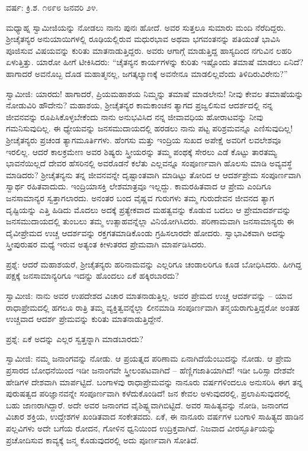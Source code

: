 \begin{center}
ವರ್ಷ: ಕ್ರಿ.ಶ. ೧೮೯೮ ಜನವರಿ ೨೪.
\end{center}

ಮಧ್ಯಾಹ್ನ ಸ್ವಾಮೀಜಿಯನ್ನು ನೋಡಲು ನಾನು ಪುನಃ ಹೋದೆ. ಅವರ ಸುತ್ತಲೂ ಸುಮಾರು ಮಂದಿ ನೆರೆದಿದ್ದರು. ಶ‍್ರೀಚೈತನ್ಯರ ಅನುಯಾಯಿಗಳಲ್ಲಿ ರೂಢಿಯಲ್ಲಿರುವ ಮಧುರಭಾವ ಅಥವಾ ಭಗವಂತನನ್ನು ಪತಿಯಂತೆ ಭಾವಿಸಿ ಪೂಜಿಸುವ ವಿಷಯವನ್ನು ಕುರಿತು ಮಾತನಾಡುತ್ತಿದ್ದರು. ಅವರು ಆಗಾಗ್ಗೆ ಮಾಡುತ್ತಿದ್ದ ಹಾಸ್ಯದಿಂದ ನಗುವಿನ ಲಹರಿ ಏಳುತ್ತಿತ್ತು. ಯಾರೋ ಹೀಗೆ ಟೀಕಿಸಿದರು: “ಚೈತನ್ಯನ ಕಾರ್ಯಗಳನ್ನು ಕುರಿತು ಇಷ್ಟೊಂದು ತಮಾಷೆ ಮಾಡಲು ಏನಿದೆ? ಹಾಗಾದರೆ ಅವನೊಬ್ಬ ದೊಡ ಮಹಾತ್ಮನಲ್ಲ, ಜಗತ್ಕಲ್ಯಾಣಕ್ಕೆ ಅವನೇನೂ ಮಾಡಲಿಲ್ಲವೆಂದು ತಿಳಿದಿರುವಿರೇನು?”

ಸ್ವಾಮೀಜಿ: ಯಾರದು! ಹಾಗಾದರೆ, ಪ್ರಿಯಮಹಾಶಯ ನಿಮ್ಮನ್ನು ತಮಾಷೆ ಮಾಡಲೇನು! ನೀವು ಕೇವಲ ತಮಾಷೆಯನ್ನು ನೋಡುವಿರಿ ಹೌದೇನು? ಮಹಾಶಯ, ಶ‍್ರೀಚೈತನ್ಯರ ಕಾಮಕಾಂಚನ ತ್ಯಾಗದ ಪ್ರಜ್ವಲಿಸುವ ಆದರ್ಶದಲ್ಲಿ ನನ್ನ ಜೀವನವನ್ನು ರೂಪಿಸಿಕೊಳ್ಳಬೇಕೆಂದು ನಾನು ಅನುಭವಿಸಿದ ನನ್ನ ಜೀವಾವಧಿಯ ಹೋರಾಟವನ್ನು ನೀವು ಗಮನಿಸುವುದಿಲ್ಲ. ಈ ಧ್ಯೇಯವನ್ನು ಜನಸಮುದಾಯದಲ್ಲಿ ಹರಡಲು ನಾನು ಪಟ್ಟ ಪರಿಶ್ರಮವನ್ನೂ ಎಣಿಸುವುದಿಲ್ಲ! ಶ‍್ರೀಚೈತನ್ಯರು ಪ್ರಚಂಡ ತ್ಯಾಗಮೂರ್ತಿಗಳು. ಹೆಂಗಸು ಮತ್ತು ಇಂದ್ರಿಯ ಸುಖದ ಅಪೇಕ್ಷೆ ಅವರಿಗೆ ಲವಲೇಶವೂ ಇರಲಿಲ್ಲ. ಆದರೆ ಕಾಲಕ್ರಮೇಣ ಅವರ ಶಿಷ್ಯರು ಸ್ತ್ರೀಯರನ್ನು ತಮ್ಮ ಪಂಥಕ್ಕೆ ಸೇರಲು ಎಡೆ ಕೊಟ್ಟು ತಾರತಮ್ಯ ಭಾವನೆಯಿಲ್ಲದೆ ದೇವರ ಹೆಸರಿನಲ್ಲಿ ಅವರೊಡನೆ ಕಲೆತು ಎಲ್ಲವನ್ನೂ ಸಂಪೂರ್ಣವಾಗಿ ಹೊಲಸು ಮಾಡಿ ಅವ್ಯವಸ್ಥೆ ಮಾಡಿದರು? ಶ‍್ರೀಚೈತನ್ಯನು ತನ್ನ ಜೀವನವನ್ನೇ ದೃಷ್ಟಾಂತವಾಗಿ ಮಾಡಿಟ್ಟು ತೋರಿದ ಆ ಆದರ್ಶಪ್ರೇಮ ಸಂಪೂರ್ಣವಾಗಿ ಸ್ವಾರ್ಥ ರಹಿತವಾದುದು. ಇಂದ್ರಿಯಾಸಕ್ತಿ ಲೇಶಮಾತ್ರವೂ ಇಲ್ಲದ್ದು. ಕಾಮರಹಿತವಾದ ಆ ಪ್ರೇಮ ಎಂದಿಗೂ ಜನಸಾಮಾನ್ಯರ ಸ್ವತ್ತಾಗಲಾರದು. ಅನಂತರ ಬಂದ ವೈಷ್ಣವ ಗುರುಗಳು ತಮ್ಮ ಗುರುದೇವನ ಜೀವನದ ತ್ಯಾಗ ದೃಷ್ಟಿಯನ್ನು ಎತ್ತಿ ಹಿಡಿದು ಮೊದಲು ಅದಕ್ಕೆ ಪ್ರತ್ಯೇಕವಾದ ಮಹತ್ವವನ್ನು ಕೊಡುವ ಬದಲು ಆ ಪ್ರೇಮಾದರ್ಶವನ್ನು ಜನಸಮುದಾಯದಲ್ಲಿ ತುಂಬಲು ತಮ್ಮ ಉತ್ಸಾಹವನ್ನೆಲ್ಲಾ ವಿನಿಯೋಗಿಸಿದರು. ಪರಿಣಾಮವಾಗಿ ಜನಸಾಮಾನ್ಯರು ಈ ದೈವೀಪ್ರೇಮದ ಉಚ್ಚ ಆದರ್ಶವನ್ನು ರಕ್ತಗತಮಾಡಿಕೊಂಡು ಗ್ರಹಿಸಲಾರದೇ ಹೋದರು. ಸ್ವಾಭಾವಿಕವಾಗಿ ಅದನ್ನು ಸ್ತ್ರೀಪುರುಷರ ಮಧ್ಯೆ ಇರುವ ಅತ್ಯಂತ ಕೀಳುತರದ ಪ್ರೇಮವಾಗಿ ಮಾರ್ಪಡಿಸಿದರು.

ಪ್ರಶ್ನೆ: ಆದರೆ ಮಹಾಶಯರೆ, ಶ‍್ರೀಚೈತನ್ಯರು ಹರಿನಾಮವನ್ನು ಎಲ್ಲರಿಗೂ ಚಂಡಾಲರಿಗೂ ಕೂಡ ಬೋಧಿಸಿದರು. ಹೀಗಿದ್ದ ಪಕ್ಷಕ್ಕೆ ಜನಸಾಮಾನ್ಯರಿಗೂ ಇದನ್ನು ಹೊಂದಲು ಏಕೆ ಹಕ್ಕಿರಬಾರದು?

ಸ್ವಾಮೀಜಿ: ನಾನು ಅವರ ಉಪದೇಶದ ವಿಚಾರ ಮಾತನಾಡುತ್ತಿಲ್ಲ. ಅವರ ಪ್ರೇಮದ ಉಚ್ಚ ಆದರ್ಶವನ್ನು – ಯಾವ ರಾಧಾಪ್ರೇಮದಲ್ಲಿ ಹಗಲೂ ರಾತ್ರಿ ತಮ್ಮ ವ್ಯಕ್ತಿತ್ವವನ್ನೆಲ್ಲಾ ಲೀನಮಾಡಿ ಸಂಪೂರ್ಣವಾಗಿ ತನ್ಮಯರಾಗುತ್ತಿದ್ದರೋ ಅಂತಹ ಉಚ್ಚವಾದ ಆದರ್ಶ ಪ್ರೇಮವನ್ನು ಕುರಿತು ಮಾತನಾಡುತ್ತಿದ್ದೇನೆ.

ಪ್ರಶ್ನೆ: ಏಕೆ ಅದನ್ನು ಎಲ್ಲರ ಸ್ವತ್ತನ್ನಾಗಿ ಮಾಡಬಾರದು?

ಸ್ವಾಮೀಜಿ: ನಮ್ಮ ಜನಾಂಗವನ್ನು ನೋಡು. ಆ ಪ್ರಯತ್ನದ ಪರಿಣಾಮ ಏನಾಗಿದೆಯೆಂಬುದನ್ನು ನೋಡು. ಆ ಪ್ರೇಮ ಪ್ರಸಾರದ ಬೋಧನೆಯಿಂದ ಇಡೀ ಜನಾಂಗವೇ ಸ್ತ್ರೀಲಂಪಟವಾಗಿದೆ – ಹೆಣ್ಣಿಗಜಾತಿಯಾಗಿದೆ! ಇಡೀ ಒರಿಸ್ಸಾ ದೇಶವೇ ಹೇಡಿಗಳ ದೇಶವಾಗಿ ಮಾರ್ಪಟ್ಟಿದೆ. ಬಂಗಾಳವು ರಾಧಾಪ್ರೇಮವನ್ನು ನಾನೂರು ವರ್ಷಗಳಿಂದಲೂ ಅನುಸರಿಸಿ ಈಗ ತನ್ನ ಪುರುಷತ್ವದ ಪರಿಜ್ಞಾನವನ್ನೇ ಸಂಪೂರ್ಣವಾಗಿ ಕಳೆದುಕೊಂಡಿದೆ! ಜನ ಕೇವಲ ಅಳುವುದರಲ್ಲಿ, ಪ್ರಲಾಪಿಸುವುದರಲ್ಲಿ ಬಹು ಜಾಣರಾಗಿದ್ದಾರೆ. ಅದೇ ಅವರ ಜನಾಂಗದ ವೈಶಿಷ್ಟ್ಯವಾಗಿಬಿಟ್ಟಿದೆ. ಅವರ ಸಾಹಿತ್ಯವನ್ನು ನೋಡಿ, ಜನಾಂಗದ ವಿಚಾರ ಶಕ್ತಿಯ, ಉದ್ದೇಶಗಳ ಖಂಡಿತವಾದ ಸಂಕೇತವದು. ಏಕೆ, ಈ ನಾನೂರು ವರ್ಷಗಳ ಬಂಗಾಳಿ ಸಾಹಿತ್ಯದ ಹಾಡಿನ ಪಲ್ಲವಿಗಳು ಅದೇ ಬಗೆಯ ರೋದನ, ಗೋಳಿನ ಧ್ವನಿಯಿಂದ ಉದ್ರಿಕ್ತವಾಗಿದೆ. ನಿಜವಾದ ವೀರಸ್ಫೂರ್ತಿಯನ್ನು ಪ್ರಚೋದಿಸುವ ಕಾವ್ಯಕ್ಕೆ ಜನ್ಮ ಕೊಡುವುದರಲ್ಲಿ ಅದು ಪೂರ್ಣವಾಗಿ ಸೋತಿದೆ.

